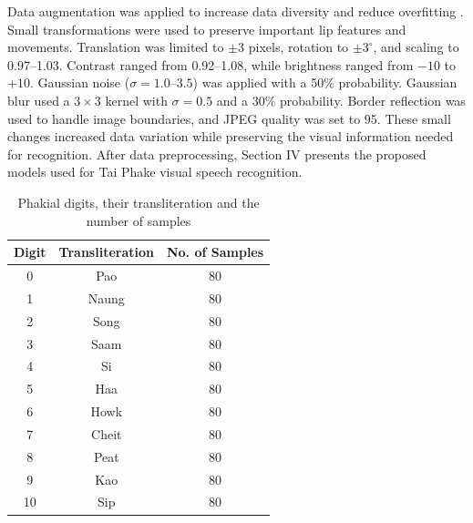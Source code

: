 \documentclass[journal]{IEEEtran}
\begin{document}
Data augmentation was applied to increase data diversity and reduce overfitting \cite{shorten2019survey}. Small transformations were used to preserve important lip features and movements. Translation was limited to $\pm3$ pixels, rotation to $\pm3^\circ$, and scaling to 0.97--1.03. Contrast ranged from 0.92--1.08, while brightness ranged from $-10$ to $+10$. Gaussian noise ($\sigma = 1.0$--$3.5$) was applied with a 50\% probability. Gaussian blur used a $3 \times 3$ kernel with $\sigma = 0.5$ and a 30\% probability. Border reflection was used to handle image boundaries, and JPEG quality was set to 95. These small changes increased data variation while preserving the visual information needed for recognition.
After data preprocessing, Section IV presents the proposed models used for Tai Phake visual speech recognition.
\begin{table}[!t]
    \centering
    \begin{tabular}{c|c|c}

        \textbf{Digit} & \textbf{Transliteration} & \textbf{No. of Samples} \\
        \hline
        0              & Pao                      & 80                      \\
        1              & Naung                    & 80                      \\
        2              & Song                     & 80                      \\
        3              & Saam                     & 80                      \\
        4              & Si                       & 80                      \\
        5              & Haa                      & 80                      \\
        6              & Howk                     & 80                      \\
        7              & Cheit                    & 80                      \\
        8              & Peat                     & 80                      \\
        9              & Kao                      & 80                      \\
        10             & Sip                      & 80                      \\
    \end{tabular}
    \vspace{0.3cm}
    \caption{Phakial digits, their transliteration and the number of samples}
    \vspace{-0.5cm}

    \label{taiphake_digits}
\end{table}
\end{document}

